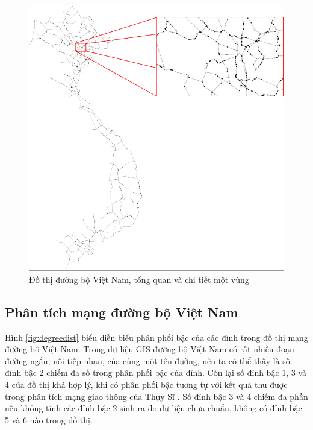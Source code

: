 \documentclass[14pt, oneside, a4paper, openany]{scrartcl}
\begin{document}
\begin{figure}[!h]
	\centering
	\includegraphics[scale=0.6]{figures/vnroadgraphtotaledit.png} 
	\caption[Đồ thị đường bộ Việt Nam]{Đồ thị đường bộ Việt Nam, tổng quan và chi tiết một vùng}
	\label{fig:vnhighwaynet}
\end{figure}
\subsection{Phân tích mạng đường bộ Việt Nam}
Hình \ref{fig:degreedist} biểu diễn biểu phân phối bậc của các đỉnh trong đồ thị mạng đường bộ Việt Nam. Trong dữ liệu GIS đường bộ Việt Nam có rất nhiều đoạn đường ngắn, nối tiếp nhau, của cùng một tên đường, nên ta có thể thấy là số đỉnh bậc 2 chiếm đa số trong phân phối bậc của đỉnh. Còn lại số đỉnh bậc 1, 3 và 4 của đồ thị khá hợp lý, khi có phân phối bậc tương tự với kết quả thu được trong phân tích mạng giao thông của Thụy Sĩ \cite{swissroad}. Số đỉnh bậc 3 và 4 chiếm đa phần nếu không tính các đỉnh bậc 2 sinh ra do dữ liệu chưa chuẩn, không có đỉnh bậc 5 và 6 nào trong đồ thị.
\end{document}
